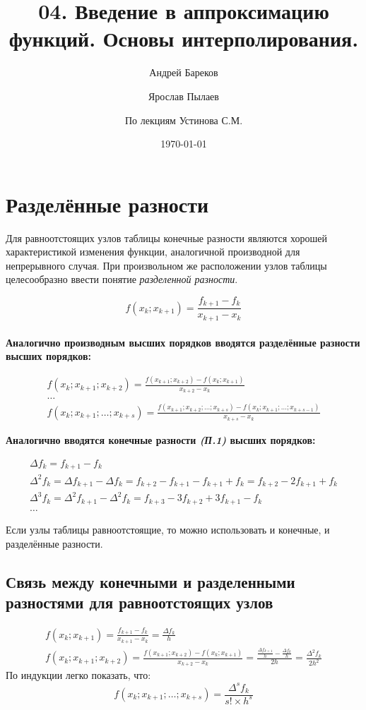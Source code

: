 \documentclass[a4paper,11pt]{article}
\title{04. Введение в аппроксимацию функций. Основы интерполирования.}
\author{Андрей Бареков \and Ярослав Пылаев \and По лекциям Устинова С.М.}
\date{\today}
\begin{document}
\maketitle
\newpage

\section{Разделённые разности}

Для равноотстоящих узлов таблицы конечные разности являются хорошей характеристикой изменения функции, аналогичной производной для непрерывного случая.
При произвольном же расположении узлов таблицы целесообразно ввести понятие \textit{разделенной разности}.

\[f(x_k; x_{k+1}) = \frac{f_{k+1} - f_k}{x_{k+1} - x_k}\] \\

\textbf{Аналогично производным высших порядков вводятся разделённые разности высших порядков:}

\begin{gather*}
  f(x_k; x_{k+1}; x_{k+2}) = \frac{f(x_{k+1}; x_{k+2}) - f(x_k; x_{k+1})}{x_{k+2} - x_k} \\
  \dots \\
  f(x_k; x_{k+1}; \dots; x_{k+s}) = \frac{f(x_{k+1}; x_{k+2}; \dots; x_{k+s})
      - f(x_k; x_{k+1}; \dots; x_{k+s-1})}{x_{k+s} - x_k}
\end{gather*}

\textbf{Аналогично вводятся конечные разности {\textit{(П.1)}} высших порядков:}

\begin{gather*}
  \Delta f_k = f_{k+1} - f_k \\
  \Delta^2 f_k = \Delta f_{k+1} - \Delta f_k = f_{k+2} - f_{k+1} - f_{k+1} + f_k = f_{k+2} - 2f_{k+1} + f_k \\
  \Delta^3 f_k = \Delta^2 f_{k+1} - \Delta^2 f_k = f_{k+3} - 3f_{k+2} + 3f_{k+1} - f_k \\
  \dots
\end{gather*}

Если узлы таблицы равноотстоящие, то можно использовать и конечные, и разделённые разности.

  \subsection{Связь между конечными и разделенными разностями для равноотстоящих узлов}

  \begin{gather*}
    f(x_k; x_{k+1}) = \frac{f_{k+1} - f_k}{x_{k+1} - x_k} = \frac{\Delta f_k}{h} \\
    f(x_k; x_{k+1}; x_{k+2}) = \frac{f(x_{k+1}; x_{k+2}) - f(x_k; x_{k+1})}{x_{k+2} - x_k}
        = \frac{\frac{\Delta f_{k+1}}{h} - \frac{\Delta f_k}{h}}{2h} = \frac{\Delta^2 f_k}{2h^2}
  \end{gather*}
  По индукции легко показать, что: \\
  \[f(x_k; x_{k+1}; \dots; x_{k+s}) = \frac{\Delta^s f_k}{s! \times h^s}\]
\newpage
\end{document}

